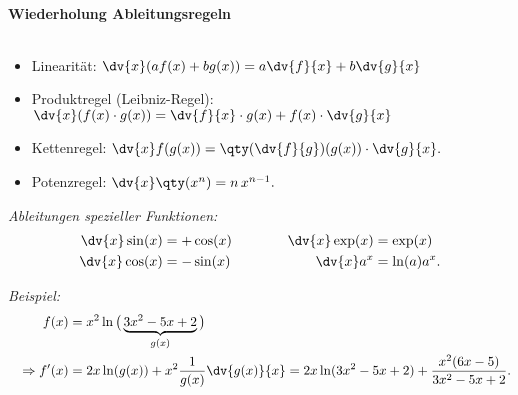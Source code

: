 
\paragraph{Wiederholung Ableitungsregeln}$~$
\begin{itemize}
    \item Linearität: $\dv{x}(a f(x) + b g(x)) = a \dv{f}{x} + b \dv{g}{x}$
    \item Produktregel (Leibniz-Regel): $\dv{x}(f(x)\cdot g(x)) = \dv{f}{x} \cdot g(x) + f(x) \cdot \dv{g}{x}$
    \item Kettenregel: $\dv{x} f(g(x)) = \qty(\dv{f}{g})(g(x))\cdot \dv{g}{x}.$
    \item Potenzregel: $\dv{x}\qty(x^n) = n \, x^{n-1}.$
\end{itemize}
\emph{Ableitungen spezieller Funktionen: }
\begin{alignat}{3}
    \dv{x}\sin(x) &= +\cos(x) &\qquad\quad \dv{x}\exp(x) &= \exp(x)\\
    \dv{x}\cos(x) &= -\sin(x) & \dv{x}a^x &= \ln(a) a^x.
\end{alignat}

\emph{Beispiel:}\\[-1.5cm]
\begin{align}
    f(x) &= x^2 \ln\big(\underbrace{3x^2-5x+2}_{g(x)}\big) \\
    \quad\Rightarrow f'(x) &= 2x \ln(g(x)) + x^2 \frac{1}{g(x)} \dv{g(x)}{x}= 2x \ln(3x^2-5x+2) + \frac{x^2(6x-5)}{3x^2 - 5x+2}.
\end{align}

